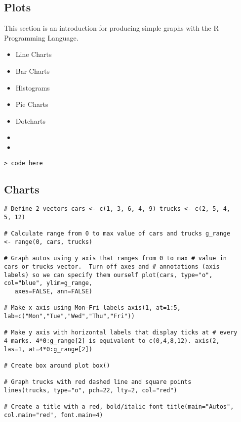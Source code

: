 \begin{frame}
\section{Plots}
This section is an introduction for producing simple graphs with
the R Programming Language.
\begin{itemize}
\item Line Charts  \item Bar Charts \item Histograms \item Pie
Charts \item Dotcharts
\end{itemize}


\begin{itemize}
\item
\item
\end{itemize}
\footnotesize \begin{verbatim}
> code here
 \end{verbatim}\normalsize


\subsection{ Charts}

\begin{myindentpar}{1cm}
\begin{verbatim}
# Define 2 vectors cars <- c(1, 3, 6, 4, 9) trucks <- c(2, 5, 4,
5, 12)

# Calculate range from 0 to max value of cars and trucks g_range
<- range(0, cars, trucks)

# Graph autos using y axis that ranges from 0 to max # value in
cars or trucks vector.  Turn off axes and # annotations (axis
labels) so we can specify them ourself plot(cars, type="o",
col="blue", ylim=g_range,
   axes=FALSE, ann=FALSE)

# Make x axis using Mon-Fri labels axis(1, at=1:5,
lab=c("Mon","Tue","Wed","Thu","Fri"))

# Make y axis with horizontal labels that display ticks at # every
4 marks. 4*0:g_range[2] is equivalent to c(0,4,8,12). axis(2,
las=1, at=4*0:g_range[2])

# Create box around plot box()

# Graph trucks with red dashed line and square points
lines(trucks, type="o", pch=22, lty=2, col="red")

# Create a title with a red, bold/italic font title(main="Autos",
col.main="red", font.main=4)


\end{verbatim}
\end{myindentpar}
\end{frame}
